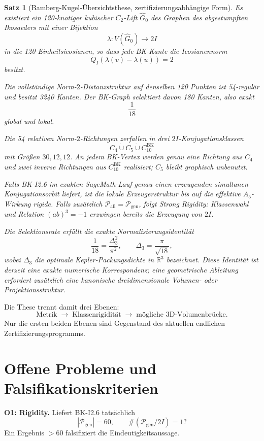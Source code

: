 \documentclass[11pt,a4paper]{article}
\newtheorem{satz}{Satz}[section]
\theoremstyle{definition}
\newcommand{\twoI}{2I}
\newcommand{\QI}{Q_I}
\newcommand{\Pgen}{\mathcal P_{\mathrm{gen}}}
\newcommand{\Pall}{\mathcal P_{\mathrm{all}}}
\newcommand{\R}{\mathbb R}
\begin{document}
\begin{satz}[Bamberg-Kugel-Übersichtsthese, zertifizierungsabhängige Form]
Es existiert ein 120-knotiger kubischer \(C_2\)-Lift \(\widehat G_0\) des Graphen des abgestumpften Ikosaeders mit einer Bijektion
\[
\lambda:V(\widehat G_0)\to\twoI
\]
in die 120 Einheitsicosianen, so dass jede BK-Kante die Icosianennorm
\[
\QI(\lambda(v)-\lambda(u))=2
\]
besitzt.

Die vollständige Norm-\(2\)-Distanzstruktur auf denselben 120 Punkten ist 54-regulär und besitzt 3240 Kanten. Der BK-Graph selektiert davon 180 Kanten, also exakt
\[
\frac1{18}
\]
global und lokal.

Die 54 relativen Norm-\(2\)-Richtungen zerfallen in drei \(\twoI\)-Konjugationsklassen
\[
C_4\dot\cup C_5\dot\cup C_{10}^{\mathrm{BK}}
\]
mit Größen \(30,12,12\). An jedem BK-Vertex werden genau eine Richtung aus \(C_4\) und zwei inverse Richtungen aus \(C_{10}^{\mathrm{BK}}\) realisiert; \(C_5\) bleibt graphisch unbenutzt.

Falls BK-I2.6 im exakten SageMath-Lauf genau einen erzeugenden simultanen Konjugationsorbit liefert, ist die lokale Erzeugerstruktur bis auf die effektive \(A_5\)-Wirkung rigide. Falls zusätzlich \(\Pall=\Pgen\), folgt Strong Rigidity: Klassenwahl und Relation \((ab)^3=-1\) erzwingen bereits die Erzeugung von \(\twoI\).

Die Selektionsrate erfüllt die exakte Normalisierungsidentität
\[
\frac1{18}=\frac{\Delta_3^2}{\pi^2},
\qquad
\Delta_3=\frac{\pi}{\sqrt{18}},
\]
wobei \(\Delta_3\) die optimale Kepler-Packungsdichte in \(\R^3\) bezeichnet. Diese Identität ist derzeit eine exakte numerische Korrespondenz; eine geometrische Ableitung erfordert zusätzlich eine kanonische dreidimensionale Volumen- oder Projektionsstruktur.
\end{satz}

Die These trennt damit drei Ebenen:
\[
\boxed{
\text{Metrik}
\;\longrightarrow\;
\text{Klassenrigidität}
\;\longrightarrow\;
\text{mögliche 3D-Volumenbrücke}.
}
\]
Nur die ersten beiden Ebenen sind Gegenstand des aktuellen endlichen Zertifizierungsprogramms.

\section{Offene Probleme und Falsifikationskriterien}

\textbf{O1: Rigidity.}
Liefert BK-I2.6 tatsächlich
\[
|\Pgen|=60,\qquad \#(\Pgen/\twoI)=1?
\]
Ein Ergebnis \(>60\) falsifiziert die Eindeutigkeitsaussage.
\end{document}
